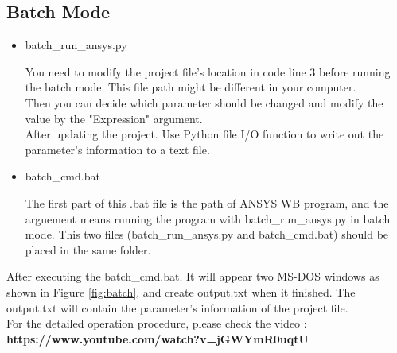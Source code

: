 \documentclass[12pt]{kjleehw}
\begin{document}
\begin{CJK}{UTF8}{bkai}
\subsection{Batch Mode}

\begin{itemize}
  \item batch\_run\_ansys.py



You need to modify the project file's location in code line 3 before running the batch mode. This file path might be different in your computer.\\



Then you can decide which parameter should be changed and modify the value by the "Expression" argument.\\



After updating the project. Use Python file I/O function to write out the parameter's information to a text file.

\end{itemize}

\begin{itemize}
  \item batch\_cmd.bat
  

  The first part of this .bat file is the path of ANSYS WB program, and the arguement means running the program with batch\_run\_ansys.py in batch mode. This two files (batch\_run\_ansys.py and batch\_cmd.bat) should be placed in the same folder.
\end{itemize}

After executing the batch\_cmd.bat. It will appear two MS-DOS windows as shown in Figure \ref{fig:batch}, and create output.txt when it finished. The output.txt will contain the parameter's information of the project file. \\

For the detailed operation procedure, please check the video : \\
\textbf{https://www.youtube.com/watch?v=jGWYmR0uqtU}


\end{CJK}
\end{document}
